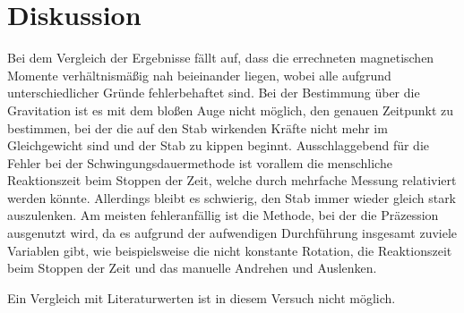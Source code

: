 \section{Diskussion}
\label{sec:Diskussion}


Bei dem Vergleich der Ergebnisse fällt auf, dass die errechneten magnetischen Momente 
verhältnismäßig nah beieinander liegen, wobei alle aufgrund unterschiedlicher Gründe 
fehlerbehaftet sind. Bei der Bestimmung über die Gravitation ist es mit dem bloßen Auge nicht möglich, 
den genauen Zeitpunkt zu bestimmen, bei der die auf den Stab wirkenden Kräfte nicht mehr im 
Gleichgewicht sind und der Stab zu kippen beginnt. Ausschlaggebend für die Fehler bei der Schwingungsdauermethode 
ist vorallem die menschliche Reaktionszeit beim Stoppen der Zeit, welche durch mehrfache Messung relativiert 
werden könnte. Allerdings bleibt es schwierig, den Stab immer wieder gleich stark auszulenken.
Am meisten fehleranfällig ist die Methode, bei der die Präzession ausgenutzt wird, da es aufgrund der aufwendigen 
Durchführung insgesamt zuviele Variablen gibt, wie beispielsweise die nicht konstante Rotation, die 
Reaktionszeit beim Stoppen der Zeit und das manuelle Andrehen und Auslenken.

\noindent Ein Vergleich mit Literaturwerten ist in diesem Versuch nicht möglich.